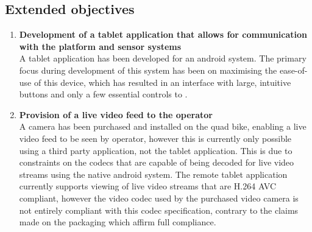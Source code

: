 \documentclass[main.tex]{subfiles}
\begin{document}
\subsection{Extended objectives}
\begin{enumerate}
\item \textbf{Development of a tablet application that allows for communication with the platform and sensor systems}\\ 
A tablet application has been developed for an android system. The primary focus during development of this system has been on maximising the ease-of-use of this device, which has resulted in an interface with large, intuitive buttons and only a few essential controls to . 



\item \textbf{Provision of a live video feed to the operator}\\ 
A camera has been purchased and installed on the quad bike, enabling a live video feed to be seen by operator, however this is currently only possible using a third party application, not the tablet application.
This is due to constraints on the codecs that are capable of being decoded for live video streams using the native android system. The remote tablet application currently supports viewing of live video streams that are H.264 AVC compliant, however the video codec used by the purchased video camera is not entirely compliant with this codec specification, contrary to the claims made on the packaging which affirm full compliance.


\end{enumerate}
\end{document}

